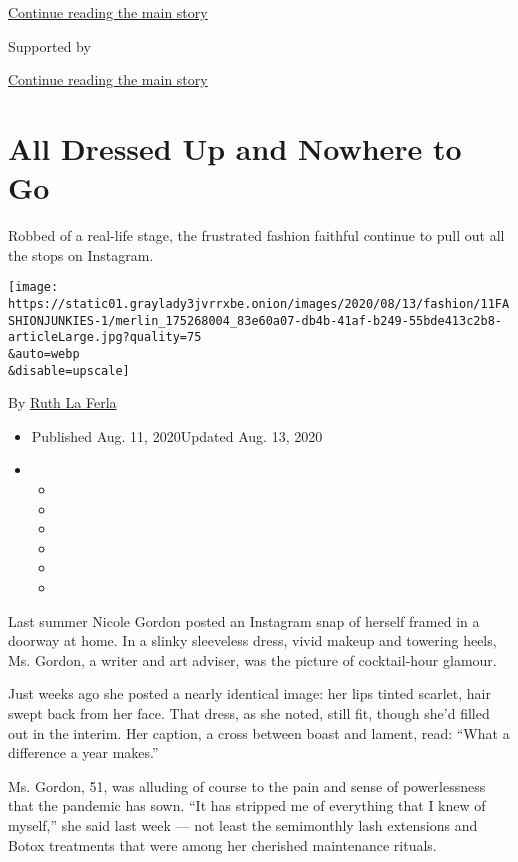 \protect\hyperlink{after-top}{Continue reading the main story}

Supported by

\protect\hyperlink{after-sponsor}{Continue reading the main story}

\hypertarget{all-dressed-up-and-nowhere-to-go}{%
\section{All Dressed Up and Nowhere to
Go}\label{all-dressed-up-and-nowhere-to-go}}

Robbed of a real-life stage, the frustrated fashion faithful continue to
pull out all the stops on Instagram.

\texttt{[image: https://static01.graylady3jvrrxbe.onion/images/2020/08/13/fashion/11FASHIONJUNKIES-1/merlin\_175268004\_83e60a07-db4b-41af-b249-55bde413c2b8-articleLarge.jpg?quality=75\\\&auto=webp\\\&disable=upscale]}

By \href{https://www.nytimes3xbfgragh.onion/by/ruth-la-ferla}{Ruth La
Ferla}

\begin{itemize}
\item
  Published Aug. 11, 2020Updated Aug. 13, 2020
\item
  \begin{itemize}
  \item
  \item
  \item
  \item
  \item
  \item
  \end{itemize}
\end{itemize}

Last summer Nicole Gordon posted an Instagram snap of herself framed in
a doorway at home. In a slinky sleeveless dress, vivid makeup and
towering heels, Ms. Gordon, a writer and art adviser, was the picture of
cocktail-hour glamour.

Just weeks ago she posted a nearly identical image: her lips tinted
scarlet, hair swept back from her face. That dress, as she noted, still
fit, though she'd filled out in the interim. Her caption, a cross
between boast and lament, read: ``What a difference a year makes.''

Ms. Gordon, 51, was alluding of course to the pain and sense of
powerlessness that the pandemic has sown. ``It has stripped me of
everything that I knew of myself,'' she said last week --- not least the
semimonthly lash extensions and Botox treatments that were among her
cherished maintenance rituals.

